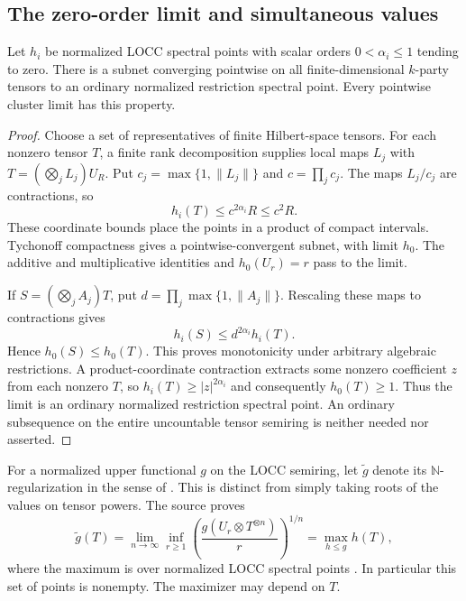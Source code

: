 \subsection{The zero-order limit and simultaneous values}

\begin{lemma}\label{lem:locc-zero-boundary}
Let $h_i$ be normalized LOCC spectral points with scalar orders
$0<\alpha_i\leq1$ tending to zero. There is a subnet converging pointwise
on all finite-dimensional $k$-party tensors to an ordinary normalized
restriction spectral point. Every pointwise cluster limit has this property.
\end{lemma}
\begin{proof}
Choose a set of representatives of finite Hilbert-space tensors. For each
nonzero tensor $T$, a finite rank decomposition supplies local maps $L_j$
with $T=(\bigotimes_jL_j)U_R$. Put
$c_j=\max\{1,\|L_j\|\}$ and $c=\prod_jc_j$. The maps $L_j/c_j$ are
contractions, so
\[
 h_i(T)\leq c^{2\alpha_i}R\leq c^2R.
\]
These coordinate bounds place the points in a product of compact intervals.
Tychonoff compactness gives a pointwise-convergent subnet, with limit $h_0$.
The additive and multiplicative identities and $h_0(U_r)=r$ pass to the
limit.

If $S=(\bigotimes_jA_j)T$, put
$d=\prod_j\max\{1,\|A_j\|\}$. Rescaling these maps to contractions gives
\[
 h_i(S)\leq d^{2\alpha_i}h_i(T).
\]
Hence $h_0(S)\leq h_0(T)$. This proves monotonicity under arbitrary
algebraic restrictions. A product-coordinate contraction extracts some
nonzero coefficient $z$ from each nonzero $T$, so
$h_i(T)\geq |z|^{2\alpha_i}$ and consequently $h_0(T)\geq1$.
Thus the limit is an ordinary normalized restriction spectral point.
An ordinary subsequence on the entire uncountable tensor semiring is
neither needed nor asserted.
\end{proof}

For a normalized upper functional $g$ on the LOCC semiring, let
$\widetilde g$ denote its $\mathbb N$-regularization in the sense of
\cite[Definition~3.13]{BugarVrana2025}. This is distinct from simply taking
roots of the values on tensor powers. The source proves
\begin{equation}\label{eq:locc-regularization}
 \widetilde g(T)
 =\lim_{n\to\infty}\inf_{r\geq1}
   \left(\frac{g(U_r\otimes T^{\otimes n})}{r}\right)^{1/n}
 =\max_{h\leq g}h(T),
\end{equation}
where the maximum is over normalized LOCC spectral points
\cite[Proposition~3.15, p.~2798, and Theorem~3.23, p.~2803]{BugarVrana2025}.
In particular this set of points is nonempty. The maximizer may depend on
$T$.

